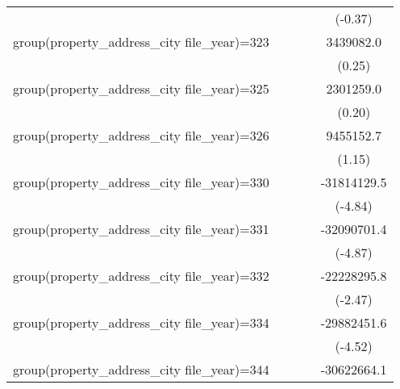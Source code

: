 {\begin{tabular}{l*{4}{c}}
                    &                     &                     &                     &     (-0.37)         \\
\addlinespace
group(property\_address\_city file\_year)=323&                     &                     &                     &   3439082.0         \\
                    &                     &                     &                     &      (0.25)         \\
\addlinespace
group(property\_address\_city file\_year)=325&                     &                     &                     &   2301259.0         \\
                    &                     &                     &                     &      (0.20)         \\
\addlinespace
group(property\_address\_city file\_year)=326&                     &                     &                     &   9455152.7         \\
                    &                     &                     &                     &      (1.15)         \\
\addlinespace
group(property\_address\_city file\_year)=330&                     &                     &                     & -31814129.5\sym{***}\\
                    &                     &                     &                     &     (-4.84)         \\
\addlinespace
group(property\_address\_city file\_year)=331&                     &                     &                     & -32090701.4\sym{***}\\
                    &                     &                     &                     &     (-4.87)         \\
\addlinespace
group(property\_address\_city file\_year)=332&                     &                     &                     & -22228295.8\sym{*}  \\
                    &                     &                     &                     &     (-2.47)         \\
\addlinespace
group(property\_address\_city file\_year)=334&                     &                     &                     & -29882451.6\sym{***}\\
                    &                     &                     &                     &     (-4.52)         \\
\addlinespace
group(property\_address\_city file\_year)=344&                     &                     &                     & -30622664.1\sym{***}\\

\end{tabular}}

